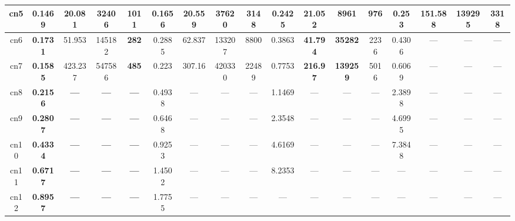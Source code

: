 \begin{tabular}{||c||c|c|c|c||c|c|c|c||c|c|c|c||c|c|c|c||}
\hline%
cn5&\small{\textbf{0.1469}}&\small{\textbf{20.081}}&\small{32406}&\small{1011}&\small{0.1656}&\small{20.559}&\small{37620}&\small{3148}&\small{0.2425}&\small{21.052}&\small{\textbf{8961}}&\small{\textbf{976}}&\small{0.253}&\small{151.588}&\small{139295}&\small{3318}\\%
\hline%
cn6&\small{\textbf{0.1731}}&\small{51.953}&\small{145182}&\small{\textbf{282}}&\small{0.2885}&\small{62.837}&\small{133207}&\small{8800}&\small{0.3863}&\small{\textbf{41.794}}&\small{\textbf{35282}}&\small{2236}&\small{0.4306}&\small{---}&\small{---}&\small{---}\\%
\hline%
cn7&\small{\textbf{0.1585}}&\small{423.237}&\small{547586}&\small{\textbf{485}}&\small{0.223}&\small{307.16}&\small{420330}&\small{22489}&\small{0.7753}&\small{\textbf{216.97}}&\small{\textbf{139259}}&\small{5016}&\small{0.6069}&\small{---}&\small{---}&\small{---}\\%
\hline%
cn8&\small{\textbf{0.2156}}&\small{\textbf{---}}&\small{\textbf{---}}&\small{\textbf{---}}&\small{0.4938}&\small{---}&\small{---}&\small{---}&\small{1.1469}&\small{---}&\small{---}&\small{---}&\small{2.3898}&\small{---}&\small{---}&\small{---}\\%
\hline%
cn9&\small{\textbf{0.2807}}&\small{\textbf{---}}&\small{\textbf{---}}&\small{\textbf{---}}&\small{0.6468}&\small{---}&\small{---}&\small{---}&\small{2.3548}&\small{---}&\small{---}&\small{---}&\small{4.6995}&\small{---}&\small{---}&\small{---}\\%
\hline%
cn10&\small{\textbf{0.4334}}&\small{\textbf{---}}&\small{\textbf{---}}&\small{\textbf{---}}&\small{0.9253}&\small{---}&\small{---}&\small{---}&\small{4.6169}&\small{---}&\small{---}&\small{---}&\small{7.3848}&\small{---}&\small{---}&\small{---}\\%
\hline%
cn11&\small{\textbf{0.6717}}&\small{\textbf{---}}&\small{\textbf{---}}&\small{\textbf{---}}&\small{1.4502}&\small{---}&\small{---}&\small{---}&\small{8.2353}&\small{---}&\small{---}&\small{---}&\small{---}&\small{---}&\small{---}&\small{---}\\%
\hline%
cn12&\small{\textbf{0.8957}}&\small{\textbf{---}}&\small{\textbf{---}}&\small{\textbf{---}}&\small{1.7755}&\small{---}&\small{---}&\small{---}&\small{---}&\small{---}&\small{---}&\small{---}&\small{---}&\small{---}&\small{---}&\small{---}\\%
\hline%
\end{tabular}